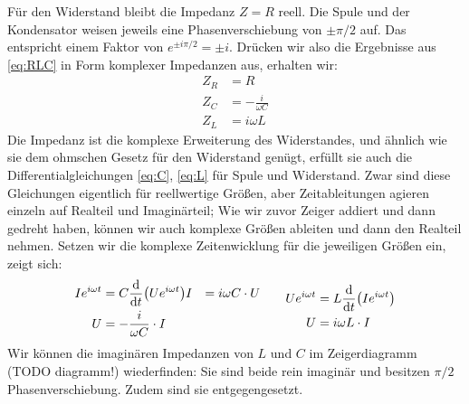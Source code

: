 Für den Widerstand bleibt die Impedanz $Z = R$ reell. Die Spule und der Kondensator weisen jeweils eine
Phasenverschiebung von $\pm \pi/2$ auf. Das entspricht einem Faktor von $e^{\pm i\pi/2}= \pm i$. Drücken wir also die
Ergebnisse aus \eqref{eq:RLC} in Form komplexer Impedanzen aus, erhalten wir:
\begin{align}
    Z_R &= R \\
    Z_C &= -\frac i{\omega C} \\
    Z_L &= i\omega L
\end{align}
Die Impedanz ist die komplexe Erweiterung des Widerstandes, und ähnlich wie sie dem ohmschen Gesetz für den Widerstand
genügt, erfüllt sie auch die Differentialgleichungen \eqref{eq:C}, \eqref{eq:L} für Spule und Widerstand. Zwar sind
diese Gleichungen eigentlich für reellwertige Größen, aber Zeitableitungen agieren einzeln auf Realteil und
Imaginärteil; Wie wir zuvor Zeiger addiert und dann gedreht haben, können wir auch komplexe Größen ableiten und dann den
Realteil nehmen. Setzen wir die komplexe Zeitenwicklung für die jeweiligen Größen ein, zeigt sich:
\begin{gather*}
    \begin{aligned}
        Ie^{i\omega t} &= C\dv{t}(Ue^{i\omega t})
        I &= i\omega C \cdot U \\
        U &= - \frac{i}{\omega C} \cdot I
    \end{aligned}
    \qquad
    \begin{aligned}
        Ue^{i\omega t} &= L\dv{t}(Ie^{i\omega t}) \\
        U &= i\omega L \cdot I
    \end{aligned}
\end{gather*}
Wir können die imaginären Impedanzen von $L$ und $C$ im Zeigerdiagramm (TODO diagramm!) wiederfinden: Sie sind beide
rein imaginär und besitzen $\pi/2$ Phasenverschiebung. Zudem sind sie entgegengesetzt.
